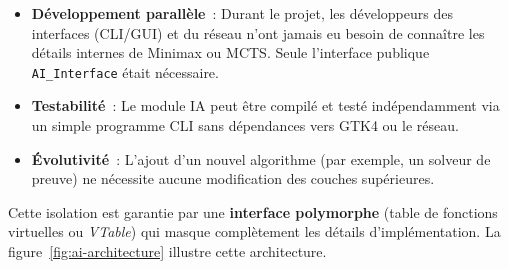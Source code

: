 \documentclass[a4paper]{article}
\begin{document}
\begin{itemize}
    \item \textbf{Développement parallèle}~: Durant le projet, les développeurs des interfaces (CLI/GUI) et du réseau n'ont jamais eu besoin de connaître les détails internes de Minimax ou MCTS. Seule l'interface publique \texttt{AI\_Interface} était nécessaire.
    \item \textbf{Testabilité}~: Le module IA peut être compilé et testé indépendamment via un simple programme CLI sans dépendances vers GTK4 ou le réseau.
    \item \textbf{Évolutivité}~: L'ajout d'un nouvel algorithme (par exemple, un solveur de preuve) ne nécessite aucune modification des couches supérieures.
\end{itemize}

Cette isolation est garantie par une \textbf{interface polymorphe} (table de fonctions virtuelles ou \textit{VTable}) qui masque complètement les détails d'implémentation. La figure~\ref{fig:ai-architecture} illustre cette architecture.
\end{document}
